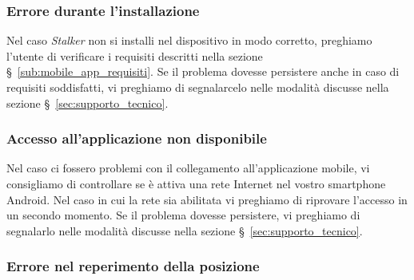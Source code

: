 \documentclass[../manuale-utente.tex]{subfiles}
\begin{document}
\subsubsection{Errore durante l'installazione}%
\label{subs:mobile_app_errore_installazione}

Nel caso \textit{Stalker} non si installi nel dispositivo in modo corretto, preghiamo l'utente di verificare i requisiti descritti nella sezione §~\ref{sub:mobile_app_requisiti}.
Se il problema dovesse persistere anche in caso di requisiti soddisfatti, vi preghiamo di segnalarcelo nelle modalità discusse nella sezione §~\ref{sec:supporto_tecnico}.

\subsubsection{Accesso all'applicazione non disponibile}%
\label{subs:mobile_app_accesso_non_disponibile}

Nel caso ci fossero problemi con il collegamento all'applicazione mobile, vi consigliamo di controllare se è attiva una rete Internet nel vostro smartphone Android.
Nel caso in cui la rete sia abilitata vi preghiamo di riprovare l’accesso in un secondo momento.
Se il problema dovesse persistere, vi preghiamo di segnalarlo nelle modalità discusse nella sezione §~\ref{sec:supporto_tecnico}.

\subsubsection{Errore nel reperimento della posizione}%
\label{subs:mobile_app_errore_posizione}
\end{document}
